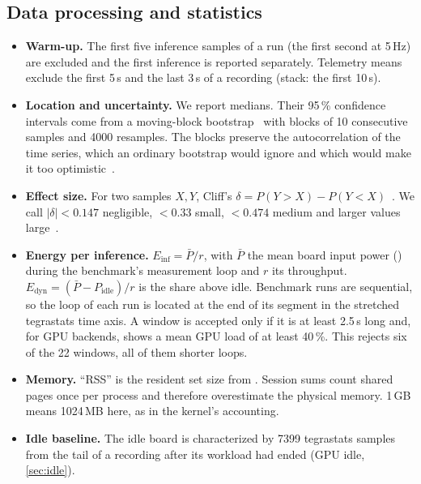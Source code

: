 \documentclass[11pt,a4paper]{article}
\begin{document}
\subsection{Data processing and statistics}\label{sec:stats}
\begin{methodbox}
\begin{itemize}[leftmargin=12pt]
  \item \textbf{Warm-up.} The first five inference samples of a run (the first second at 5\,Hz) are excluded and the
        first inference is reported separately. Telemetry means exclude the first 5\,s and the last 3\,s of a
        recording (stack: the first 10\,s).
  \item \textbf{Location and uncertainty.} We report medians. Their 95\,\% confidence intervals come from a
        moving-block bootstrap~\cite{kuensch1989} with blocks of 10 consecutive samples and 4000 resamples. The blocks
        preserve the autocorrelation of the time series, which an ordinary bootstrap would ignore and which would
        make it too optimistic~\cite{efron1993}.
  \item \textbf{Effect size.} For two samples $X, Y$, Cliff's $\delta = P(Y > X) - P(Y < X)$~\cite{cliff1993}. We
        call $|\delta| < 0.147$ negligible, $< 0.33$ small, $< 0.474$ medium and larger values large~\cite{romano2006}.
  \item \textbf{Energy per inference.} $E_{\mathrm{inf}} = \bar P / r$, with $\bar P$ the mean board input power
        () during the benchmark's measurement loop and $r$ its throughput. $E_{\mathrm{dyn}} =
        (\bar P - P_{\mathrm{idle}})/r$ is the share above idle. Benchmark runs are sequential, so the loop of each
        run is located at the end of its segment in the stretched tegrastats time axis. A window is accepted only if
        it is at least 2.5\,s long and, for GPU backends, shows a mean GPU load of at least 40\,\%. This rejects six of
        the 22 windows, all of them shorter loops.
  \item \textbf{Memory.} \enquote{RSS} is the resident set size from . Session sums count shared pages
        once per process and therefore overestimate the physical memory. 1\,GB means 1024\,MB here, as in the
        kernel's accounting.
  \item \textbf{Idle baseline.} The idle board is characterized by 7399 tegrastats samples from the tail of a
        recording after its workload had ended (GPU idle, \cref{sec:idle}).
\end{itemize}
\end{methodbox}
\end{document}

